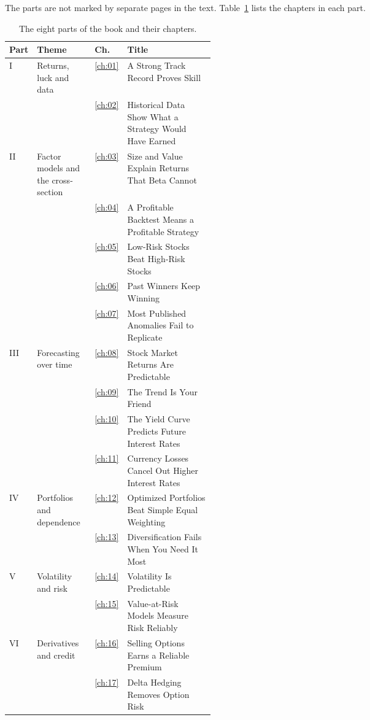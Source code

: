 The parts are not marked by separate pages in the text. Table~\ref{tab:pref-parts} lists the chapters in each part.

\begin{table}[htbp]
\centering
\small
\caption{The eight parts of the book and their chapters.}
\label{tab:pref-parts}
\begin{tabularx}{0.95\linewidth}{@{}>{\raggedright\arraybackslash}p{0.07\linewidth}>{\raggedright\arraybackslash}p{0.28\linewidth}>{\raggedleft\arraybackslash}p{0.04\linewidth}>{\raggedright\arraybackslash}X@{}}
\toprule
Part & Theme & Ch. & Title \\
\midrule
I & Returns, luck and data & \ref{ch:01} & A Strong Track Record Proves Skill \\
 &  & \ref{ch:02} & Historical Data Show What a Strategy Would Have Earned \\
\addlinespace
II & Factor models and the cross-section & \ref{ch:03} & Size and Value Explain Returns That Beta Cannot \\
 &  & \ref{ch:04} & A Profitable Backtest Means a Profitable Strategy \\
 &  & \ref{ch:05} & Low-Risk Stocks Beat High-Risk Stocks \\
 &  & \ref{ch:06} & Past Winners Keep Winning \\
 &  & \ref{ch:07} & Most Published Anomalies Fail to Replicate \\
\addlinespace
III & Forecasting over time & \ref{ch:08} & Stock Market Returns Are Predictable \\
 &  & \ref{ch:09} & The Trend Is Your Friend \\
 &  & \ref{ch:10} & The Yield Curve Predicts Future Interest Rates \\
 &  & \ref{ch:11} & Currency Losses Cancel Out Higher Interest Rates \\
\addlinespace
IV & Portfolios and dependence & \ref{ch:12} & Optimized Portfolios Beat Simple Equal Weighting \\
 &  & \ref{ch:13} & Diversification Fails When You Need It Most \\
\addlinespace
V & Volatility and risk & \ref{ch:14} & Volatility Is Predictable \\
 &  & \ref{ch:15} & Value-at-Risk Models Measure Risk Reliably \\
\addlinespace
VI & Derivatives and credit & \ref{ch:16} & Selling Options Earns a Reliable Premium \\
 &  & \ref{ch:17} & Delta Hedging Removes Option Risk \\

\end{tabularx}
\end{table}

